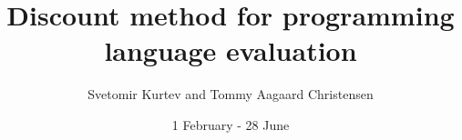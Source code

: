 \usepackage[english]{babel}
\usepackage[utf8]{inputenc}
\usepackage[T1]{fontenc}
\usepackage{graphicx}
\usepackage{lscape}%
\usepackage{cite}
\usepackage{setspace}
\usepackage[hyphens]{url}
\usepackage{times}
\usepackage[backref]{hyperref}
\usepackage{verbatim}
\usepackage{wrapfig} %
\usepackage{float}
\usepackage{listings}
\usepackage{color}
\usepackage{textcomp}
\usepackage{mathtools}
\usepackage{fullpage}
\usepackage{lastpage}
\usepackage{pdfpages}
\usepackage{enumitem}
\usepackage{amsfonts} %
\usepackage{booktabs}
\usepackage{multirow}
\usepackage{caption}
\usepackage{subcaption}
\usepackage[babel=true,strict=true,german=quotes,threshold=1]{csquotes}
\usepackage{tikz}
\usepackage{pgfplots}
\usepackage{enumitem}
\usetikzlibrary{patterns}
\pgfplotsset{width=7cm,compat=1.10}


\usepackage{listings}

\setlength{\parindent}{0pt}
\setlength{\parskip}{1.5ex}

\title{Discount method for programming language evaluation}
\author{Svetomir Kurtev and Tommy Aagaard Christensen }
\date{1 February - 28 June}

\newcommand{\figref}[1]{Figure~\ref{#1}}
\newcommand{\secref}[1]{Section~\ref{#1}}
\newcommand{\tabref}[1]{Table~\ref{#1}}
\newcommand{\chapref}[1]{Chapter~\ref{#1}}
\newcommand{\appref}[1]{Appendix~\ref{#1}}
\newcommand{\partref}[1]{Part~\ref{#1}}
\newcommand{\lstref}[1]{Listing~\ref{#1}}
\newcommand{\algoref}[1]{Algorithm~\ref{#1}}
\newcommand{\hypref}[1]{Hypothesis~\ref{#1}}
\newcommand{\equref}[1]{Equation~\eqref{#1}}
\newcommand\todo[1]{\textcolor{red}{TODO: #1}} %